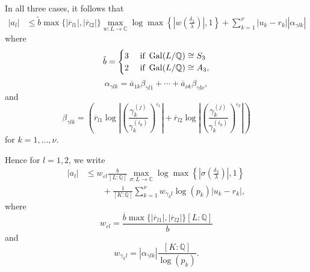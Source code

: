 In all three cases, it follows that
\begin{align*}
|a_l| & \leq \tilde{b} \max\{|\overline{r}_{l1}|, |\overline{r}_{l2}|\}\max_{w:L\to \mathbb{C}} \log \max \left\{ \left|w\left(\frac{\delta_2}{\lambda}\right)\right|, 1\right\} + \sum_{k=1}^{\nu}|u_k-r_k||\alpha_{\gamma l k}|
\end{align*}
where
\[\tilde{b} =
\begin{cases}
3 & \text{ if } \operatorname{Gal}(L/\mathbb{Q}) \cong S_3\\
2 & \text{ if } \operatorname{Gal}(L/\mathbb{Q}) \cong A_3,
\end{cases}\]
\[\alpha_{\gamma l k} = \overline{a}_{1k}\beta_{\gamma l 1} + \cdots + \overline{a}_{\nu k}\beta_{\gamma l \nu},\]
and
\[\beta_{\gamma l k} = \left(\overline{r}_{l1} \log\left| \left( \frac{\gamma_k^{(j)}}{\gamma_k^{(i_0)}}\right)^{\iota_1}\right|+ \overline{r}_{l2}\log\left| \left( \frac{\gamma_k^{(j)}}{\gamma_k^{(i_0)}}\right)^{\iota_2}\right|\right)\]
for $k = 1, \dots, \nu$.

Hence for $l = 1,2$, we write
\begin{align} \label{eq:albound}
|a_l|	& \leq  w_{\varepsilon l} \frac{b}{[L:\mathbb{Q}]} \max_{\sigma :L \to \mathbb{C}} \log \max \left\{ \left|\sigma\left(\frac{\delta_2}{\lambda}\right)\right|, 1\right\} \\
	& \quad\quad+ \frac{1}{[K:\mathbb{Q}]}\sum_{k = 1}^{\nu} w_{\gamma_k l}\log(p_k)|u_k - r_k|,
\end{align}
where
\begin{equation} \label{eq:welsigma}
w_{\varepsilon l} = \frac{\overline{b}\max\{|\overline{r}_{l1}|, |\overline{r}_{l2}|\}[L:\mathbb{Q}]}{b}
\end{equation}
and 
\begin{equation} \label{eq:wgammalk}
w_{\gamma_k l} = |\alpha_{\gamma l k}|\frac{[K:\mathbb{Q}]}{\log(p_k)}.
\end{equation}

